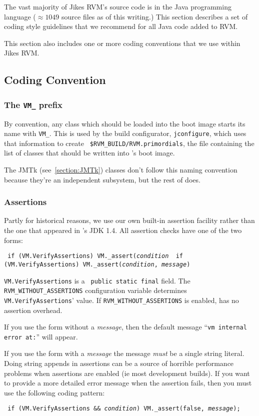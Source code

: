 The vast majority of Jikes RVM's source code is in the Java
programming language ($\approx 1049$
source files as of this writing.)  This section describes a set of
coding style guidelines that we recommend for all Java code added to
\JikesTMweb{} RVM.

This section also includes one or more coding conventions that we
use within Jikes RVM.  

\subsection{Coding Convention}

\subsubsection{The {\tt VM\_} prefix}

By convention, any class which should be loaded into the boot image
starts its name with {\tt VM\_}.  This is used by the build configurator,
{\tt jconfigure}, which uses that information to create {\tt
\$RVM\_BUILD/RVM.primordials}, the file containing the list of classes
that should be written into \jrvm{}'s  boot image.

The JMTk (see~\ref{section:JMTk}) classes don't follow this naming convention
because they're an independent subsystem, but the rest of \jrvm{} does.

\subsubsection{Assertions}
\label{assertions}

Partly for historical reasons, we use our own built-in assertion
facility rather than the one that appeared in \SunRweb{}'s JDK 1.4.   All
assertion checks have one of the two forms:
\begin{example}
\tt{}    if (VM.VerifyAssertions)  VM._assert({\it condition}
\tt{}    if (VM.VerifyAssertions)  VM._assert({\it condition}, {\it message})
\end{example}
{\tt VM.VerifyAssertions} is a {\tt 
public static final} field.  The {\tt RVM\_WITHOUT\_ASSERTIONS}
configuration variable determines {\tt VM.VerifyAssertions}' value.
If {\tt RVM\_WITHOUT\_ASSERTIONS} is enabled, \jrvm{} has no assertion
overhead. 

If you use the form without a {\it message}, then the default message
``{\tt vm internal error at:}''  will appear.  

If you use the form with a {\it message} the message {\em must} be a
single string literal.  Doing string appends in assertions can be a
source of horrible performance problems when assertions are enabled
(ie most development builds).  If you want to provide a
more detailed error message when the assertion fails, then you must
use the following coding pattern:
\begin{example}
\tt{}   if (VM.VerifyAssertions && {\it condition}) VM._assert(false, {\it message});
\end{example}

